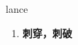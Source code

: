 
\begin{frame}
{\huge lance}
\begin{center}
\begin{enumerate}\Large
  \item \textbf{刺穿，刺破}
\end{enumerate}
\end{center}
\end{frame}
